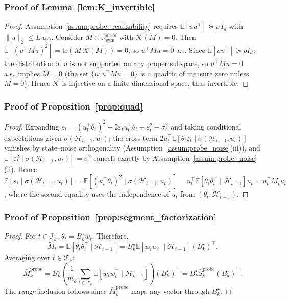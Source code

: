 \documentclass{article}
\newcommand{\R}{\mathbb{R}}
\newcommand{\E}{\mathbb{E}}
\newcommand{\cH}{\mathcal{H}}
\begin{document}
\subsubsection{Proof of Lemma~\ref{lem:K_invertible}}
\label{proof:K_invertible}

\begin{proof}
Assumption~\ref{assum:probe_realizability} requires $\E[uu^\top] \succeq \rho\, I_d$ with $\|u\|_2 \le L$ a.s.
Consider $M \in \R^{d\times d}_{\mathrm{sym}}$ with $\mathcal K(M) = 0$.
Then $\E[(u^\top M u)^2] = \mathrm{tr}(M\,\mathcal K(M)) = 0$, so $u^\top M u = 0$ a.s.
Since $\E[uu^\top] \succeq \rho I_d$, the distribution of $u$ is not supported on any proper subspace, so $u^\top M u = 0$ a.s.\ implies $M = 0$
(the set $\{u : u^\top M u = 0\}$ is a quadric of measure zero unless $M=0$).
Hence $\mathcal K$ is injective on a finite-dimensional space, thus invertible.
\end{proof}

\subsubsection{Proof of Proposition~\ref{prop:quad}}
\label{proof:quad}

\begin{proof}
Expanding $s_t = (u_t^\top \theta_t)^2 + 2\varepsilon_t u_t^\top \theta_t + \varepsilon_t^2 - \sigma_\varepsilon^2$ and taking conditional expectations given $\sigma(\cH_{t-1},u_t)$:
the cross term $2u_t^\top \E[\theta_t\varepsilon_t \mid \sigma(\cH_{t-1},u_t)]$ vanishes by state--noise orthogonality (Assumption~\ref{assum:probe_noise}(iii)), and $\E[\varepsilon_t^2 \mid \sigma(\cH_{t-1},u_t)] = \sigma_\varepsilon^2$ cancels exactly by Assumption~\ref{assum:probe_noise}(ii).
Hence $\E[s_t \mid \sigma(\cH_{t-1},u_t)] = \E[(u_t^\top \theta_t)^2 \mid \sigma(\cH_{t-1},u_t)] = u_t^\top \E[\theta_t\theta_t^\top \mid \cH_{t-1}] u_t = u_t^\top \widetilde M_t u_t$,
where the second equality uses the independence of $u_t$ from $(\theta_t, \cH_{t-1})$.
\end{proof}

\subsubsection{Proof of Proposition~\ref{prop:segment_factorization}}
\label{proof:segment_factorization}

\begin{proof}
For $t\in \mathcal I_k$, $\theta_t = B_k^\star w_t$. Therefore,
\[
\widetilde M_t
=
\E[\theta_t\theta_t^\top \mid \mathcal H_{t-1}]
=
B_k^\star \E[w_t w_t^\top \mid \mathcal H_{t-1}] (B_k^\star)^\top.
\]
Averaging over $t\in\mathcal T_k$:
\[
\bar M_k^{\mathrm{probe}}
=
B_k^\star
\!\left(
\frac{1}{m_k}\sum_{t\in \mathcal T_k}\E[w_t w_t^\top \mid \mathcal H_{t-1}]
\right)
(B_k^\star)^\top
=
B_k^\star \bar S_k^{\mathrm{probe}} (B_k^\star)^\top.
\]
The range inclusion follows since $\bar M_k^{\mathrm{probe}}$ maps any vector through $B_k^\star$.
\end{proof}
\end{document}
